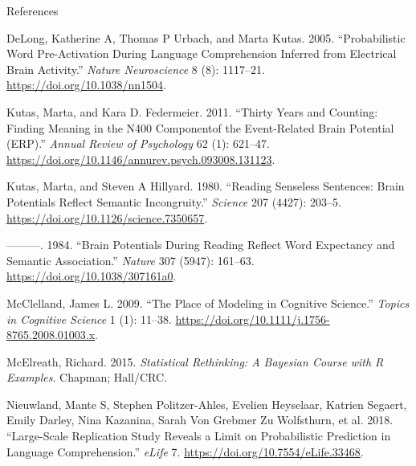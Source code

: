 \documentclass[12pt,ignorenonframetext,aspectratio=169]{beamer}
\begin{document}
\begin{frame}{References}
\protect\hypertarget{references}{}

\hypertarget{refs}{}
\leavevmode\hypertarget{ref-delongProbabilisticWordPreactivation2005}{}%
DeLong, Katherine A, Thomas P Urbach, and Marta Kutas. 2005. ``Probabilistic Word Pre-Activation During Language Comprehension Inferred from Electrical Brain Activity.'' \emph{Nature Neuroscience} 8 (8): 1117--21. \url{https://doi.org/10.1038/nn1504}.

\leavevmode\hypertarget{ref-kutasThirtyYearsCounting2011}{}%
Kutas, Marta, and Kara D. Federmeier. 2011. ``Thirty Years and Counting: Finding Meaning in the N400 Componentof the Event-Related Brain Potential (ERP).'' \emph{Annual Review of Psychology} 62 (1): 621--47. \url{https://doi.org/10.1146/annurev.psych.093008.131123}.

\leavevmode\hypertarget{ref-kutasReadingSenselessSentences1980}{}%
Kutas, Marta, and Steven A Hillyard. 1980. ``Reading Senseless Sentences: Brain Potentials Reflect Semantic Incongruity.'' \emph{Science} 207 (4427): 203--5. \url{https://doi.org/10.1126/science.7350657}.

\leavevmode\hypertarget{ref-kutasBrainPotentialsReading1984}{}%
---------. 1984. ``Brain Potentials During Reading Reflect Word Expectancy and Semantic Association.'' \emph{Nature} 307 (5947): 161--63. \url{https://doi.org/10.1038/307161a0}.

\leavevmode\hypertarget{ref-mcclellandPlaceModelingCognitive2009}{}%
McClelland, James L. 2009. ``The Place of Modeling in Cognitive Science.'' \emph{Topics in Cognitive Science} 1 (1): 11--38. \url{https://doi.org/10.1111/j.1756-8765.2008.01003.x}.

\leavevmode\hypertarget{ref-mcelreath2015statistical}{}%
McElreath, Richard. 2015. \emph{Statistical Rethinking: A Bayesian Course with R Examples}. Chapman; Hall/CRC.

\leavevmode\hypertarget{ref-nieuwlandLargescaleReplicationStudy2018}{}%
Nieuwland, Mante S, Stephen Politzer-Ahles, Evelien Heyselaar, Katrien Segaert, Emily Darley, Nina Kazanina, Sarah Von Grebmer Zu Wolfsthurn, et al. 2018. ``Large-Scale Replication Study Reveals a Limit on Probabilistic Prediction in Language Comprehension.'' \emph{eLife} 7. \url{https://doi.org/10.7554/eLife.33468}.

\end{frame}
\end{document}
